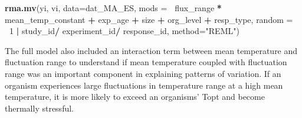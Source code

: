 \documentclass[12pt,twoside]{reedthesis}
\newenvironment{Shaded}{\begin{snugshade}}{\end{snugshade}}
\newcommand{\DataTypeTok}[1]{\textcolor[rgb]{0.13,0.29,0.53}{#1}}
\newcommand{\DecValTok}[1]{\textcolor[rgb]{0.00,0.00,0.81}{#1}}
\newcommand{\KeywordTok}[1]{\textcolor[rgb]{0.13,0.29,0.53}{\textbf{#1}}}
\newcommand{\NormalTok}[1]{#1}
\newcommand{\OperatorTok}[1]{\textcolor[rgb]{0.81,0.36,0.00}{\textbf{#1}}}
\newcommand{\StringTok}[1]{\textcolor[rgb]{0.31,0.60,0.02}{#1}}
\begin{document}
\begin{Shaded}
\begin{Highlighting}[]
\KeywordTok{rma.mv}\NormalTok{(yi, vi, }\DataTypeTok{data=}\NormalTok{dat_MA_ES, }\DataTypeTok{mods =} \OperatorTok{~}\NormalTok{flux_range }\OperatorTok{*}\StringTok{ }\NormalTok{mean_temp_constant }
       \OperatorTok{+}\StringTok{ }\NormalTok{exp_age }\OperatorTok{+}\StringTok{ }\NormalTok{size }\OperatorTok{+}\StringTok{ }\NormalTok{org_level }\OperatorTok{+}\StringTok{ }\NormalTok{resp_type, }
               \DataTypeTok{random =} \OperatorTok{~}\DecValTok{1} \OperatorTok{|}\StringTok{  }\NormalTok{study_id}\OperatorTok{/}\StringTok{ }\NormalTok{experiment_id}\OperatorTok{/}\StringTok{ }\NormalTok{response_id,}
                 \DataTypeTok{method=}\StringTok{"REML"}\NormalTok{) }
\end{Highlighting}
\end{Shaded}
The full model also included an interaction term between mean temperature and fluctuation range to understand if mean temperature coupled with fluctuation range was an important component in explaining patterns of variation. If an organism experiences large fluctuations in temperature range at a high mean temperature, it is more likely to exceed an organisms' Topt and become thermally stressful.
\end{document}
